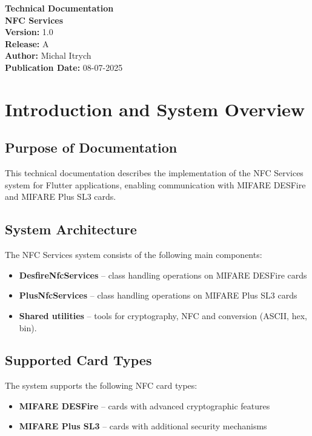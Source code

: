 \documentclass[a4paper,12pt]{article}
\begin{document}
\vspace*{1cm}

\begin{center}
\begin{tcolorbox}[width=0.8\textwidth, sharp corners, boxrule=0.5pt]
    \centering
    \textbf{\Large Technical Documentation \\ NFC Services} \\[1.5em]
    \textbf{Version:} 1.0 \\
    \textbf{Release:} A \\[1.5em]
    \textbf{Author:} Michal Itrych \\[1.5em]
    \textbf{Publication Date:} 08-07-2025
\end{tcolorbox}
\end{center}

\newpage
\tableofcontents
\newpage

\section{Introduction and System Overview}

\subsection{Purpose of Documentation}
This technical documentation describes the implementation of the NFC Services system for Flutter applications, enabling communication with MIFARE DESFire and MIFARE Plus SL3 cards.

\subsection{System Architecture}
The NFC Services system consists of the following main components:

\begin{itemize}
    \item \textbf{DesfireNfcServices} -- class handling operations on MIFARE DESFire cards
    \item \textbf{PlusNfcServices} -- class handling operations on MIFARE Plus SL3 cards
    \item \textbf{Shared utilities} -- tools for cryptography, NFC and conversion (ASCII, hex, bin).
\end{itemize}

\subsection{Supported Card Types}
The system supports the following NFC card types:
\begin{itemize}
    \item \textbf{MIFARE DESFire} -- cards with advanced cryptographic features
    \item \textbf{MIFARE Plus SL3} -- cards with additional security mechanisms
\end{itemize}
\end{document}
